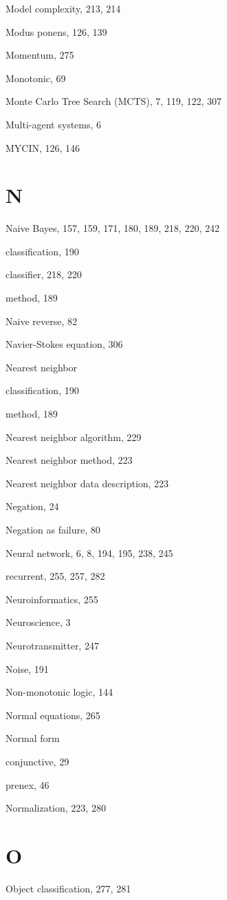 \documentclass[10pt]{book}
\begin{document}
Model complexity, 213, 214

Modus ponens, 126, 139

Momentum, 275

Monotonic, 69

Monte Carlo Tree Search (MCTS), 7, 119, 122, 307

Multi-agent systems, 6

MYCIN, 126, 146

\section{N}

Naive Bayes, 157, 159, 171, 180, 189, 218, 220, 242

classification, 190

classifier, 218, 220

method, 189

Naive reverse, 82

Navier-Stokes equation, 306

Nearest neighbor

classification, 190

method, 189

Nearest neighbor algorithm, 229

Nearest neighbor method, 223

Nearest neighbor data description, 223

Negation, 24

Negation as failure, 80

Neural network, 6, 8, 194, 195, 238, 245

recurrent, 255, 257, 282

Neuroinformatics, 255

Neuroscience, 3

Neurotransmitter, 247

Noise, 191

Non-monotonic logic, 144

Normal equations, 265

Normal form

conjunctive, 29

prenex, 46

Normalization, 223, 280

\section{O}

Object classification, 277, 281
\end{document}
